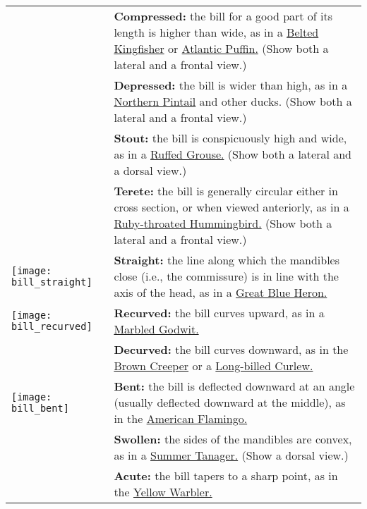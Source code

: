 \documentclass[10pt]{article}
\begin{document}
\begin{longtable}{@{}C{0.45\textwidth}L{0.45\textwidth}@{}}
& \textbf{Compressed:} the bill for a good part of its length is higher than wide, as in a \href{https://www.allaboutbirds.org/guide/Belted_Kingfisher}{Belted Kingfisher} or \href{https://www.allaboutbirds.org/guide/Atlantic_Puffin}{Atlantic Puffin.} (Show both a lateral and a frontal view.)\\ [2.5cm]
%
& \textbf{Depressed:} the bill is wider than high, as in a \href{https://www.allaboutbirds.org/guide/Northern_Pintail}{Northern Pintail} and other ducks. (Show both a lateral and a frontal view.)\\ [2.5cm]
%
& \textbf{Stout:} the bill is conspicuously high and wide, as in a \href{https://www.allaboutbirds.org/guide/Ruffed_Grouse}{Ruffed Grouse.} (Show both a lateral and a dorsal view.)\\ [2.5cm]
%
& \textbf{Terete:} the bill is generally circular either in cross section, or when viewed anteriorly, as in a \href{https://www.allaboutbirds.org/guide/Ruby-throated_Hummingbird}{Ruby-throated Hummingbird.} (Show both a lateral and a frontal view.)\\ [2.5cm]
%
\texttt{[image: bill\_straight]} & \textbf{Straight:} the line along which the mandibles close (i.e., the commissure) is in line with the axis of the head, as in a \href{https://www.allaboutbirds.org/guide/Great_Blue_Heron}{Great Blue Heron.} \\ [2.5cm]
%
\texttt{[image: bill\_recurved]} & \textbf{Recurved:} the bill curves upward, as in a \href{https://www.allaboutbirds.org/guide/Marbled_Godwit#}{Marbled Godwit.}\\ [2.5cm]
%
& \textbf{Decurved:} the bill curves downward, as in the \href{https://www.allaboutbirds.org/guide/Brown_Creeper}{Brown Creeper} or a \href{https://www.allaboutbirds.org/guide/Long-billed_Curlew}{Long-billed Curlew.} \\ [2.5cm]
%
\texttt{[image: bill\_bent]}& \textbf{Bent:} the bill is deflected downward at an angle (usually deflected downward at the middle), as in the \href{https://ebird.org/species/grefla2}{American Flamingo.} \\ [2.5cm]
%
& \textbf{Swollen:} the sides of the mandibles are convex, as in a \href{https://www.allaboutbirds.org/guide/Summer_Tanager}{Summer Tanager.} (Show a dorsal view.)\\ [2.5cm]
%
& \textbf{Acute:} the bill tapers to a sharp point, as in the \href{https://www.allaboutbirds.org/guide/Yellow_Warbler/}{Yellow Warbler.}\\ [2.5cm]

\end{longtable}
\end{document}
